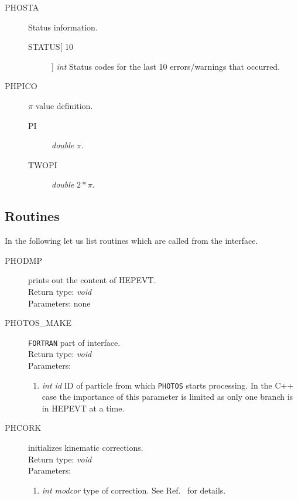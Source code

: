 \documentclass[]{Photos_interface_design}
\begin{document}
\begin{description}
\item[PHOSTA] Status information.
    \begin{description}
    \item[STATUS[ 10]]  \textit{int} Status codes for the last 10 errors/warnings
    that occurred.
    \end{description}
\end{description}

\begin{description}
\item[PHPICO] $\pi$ value definition.
    \begin{description}
    \item[PI]  \textit{double} $\pi$.
	\item[TWOPI]  \textit{double} $2*\pi$.
    \end{description}
\end{description}

\subsection{Routines}

In the following let us list routines which are called from the interface.

\begin{description}
\item[PHODMP] prints out the content of HEPEVT. \\
  Return type: \textit{void} \\
  Parameters: none
\end{description}

\begin{description}
\item[PHOTOS\_MAKE] {\tt FORTRAN} part of interface. \\
  Return type: \textit{void} \\
  Parameters:
  \begin{enumerate}
    \item \textit {int id} ID of particle from which {\tt PHOTOS} starts processing. In the C++ case the importance of this parameter is limited as only one branch is in HEPEVT at a time.
  \end{enumerate}
\end{description}

\begin{description}
\item[PHCORK] initializes kinematic corrections. \\
  Return type: \textit{void} \\
  Parameters:
  \begin{enumerate}
    \item \textit {int modcor} type of correction. See Ref.~\cite{Golonka:2005pn}  for details.
  \end{enumerate}
\end{description}
\end{document}
